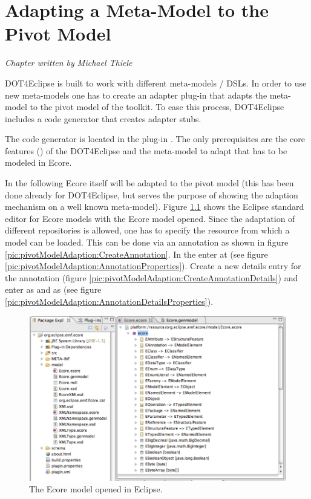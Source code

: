 \chapter{Adapting a Meta-Model to the Pivot Model}
\label{chapter:pivotModelAdaptation}

\begin{flushright}
\textit{Chapter written by Michael Thiele}
\end{flushright}

\acl{DOT4Eclipse} is built to work with different meta-models / DSLs. In order to use new meta-models one has to create an adapter plug-in that adapts the meta-model to the pivot model of the toolkit. To ease this process, \acl{DOT4Eclipse} includes a code generator that creates adapter stubs.

The code generator is located in the plug-in . The only prerequisites are the core features () of the \acl{DOT4Eclipse} and the meta-model to adapt that has to be modeled in Ecore.

In the following Ecore itself will be adapted to the pivot model (this has been done already for \acl{DOT4Eclipse}, but serves the purpose of showing the adaption mechanism on a well known meta-model). Figure \ref{pic:pivotModelAdaptation:EcoreOverview} shows the Eclipse standard editor for Ecore models with the Ecore model opened. Since the adaptation of different repositories is allowed, one has to specify the resource from which a model can be loaded. This can be done via an annotation as shown in figure \ref{pic:pivotModelAdaption:CreateAnnotation}. In the  enter  at  (see figure \ref{pic:pivotModelAdaption:AnnotationProperties}). Create a new details entry for the annotation (figure \ref{pic:pivotModelAdaption:CreateAnnotationDetails}) and enter  as  and  as  (see figure \ref{pic:pivotModelAdaption:AnnotationDetailsProperties}).

\begin{figure}[!htbp]
	\centering
	\includegraphics[width=1.0\linewidth]{figures/pivotModelAdaption/EcoreOverview}
	\caption{The Ecore model opened in Eclipse.}
	\label{pic:pivotModelAdaptation:EcoreOverview}
\end{figure}


